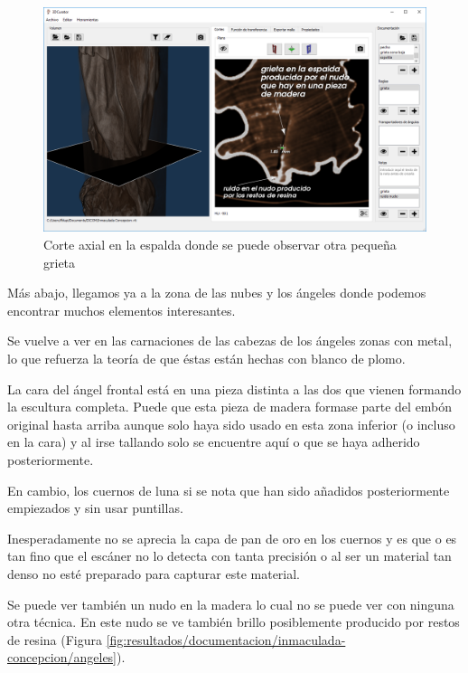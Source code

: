 \begin{figure}[H]
	\centering
	\includegraphics[width=12.5cm]{imagenes/resultados/documentacion/inmaculada-concepcion/espalda}
	\caption{Corte axial en la espalda donde se puede observar otra pequeña grieta}
	\label{fig:resultados/documentacion/inmaculada-concepcion/espalda}
\end{figure}

Más abajo, llegamos ya a la zona de las nubes y los ángeles donde podemos encontrar muchos elementos interesantes.

Se vuelve a ver en las carnaciones de las cabezas de los ángeles zonas con metal, lo que refuerza la teoría de que éstas están hechas con blanco de plomo.

La cara del ángel frontal está en una pieza distinta a las dos que vienen formando la escultura completa. Puede que esta pieza de madera formase parte del embón original hasta arriba aunque solo haya sido usado en esta zona inferior (o incluso en la cara) y al irse tallando solo se encuentre aquí o que se haya adherido posteriormente.

En cambio, los cuernos de luna si se nota que han sido añadidos posteriormente empiezados y sin usar puntillas.

Inesperadamente no se aprecia la capa de pan de oro en los cuernos y es que o es tan fino que el escáner no lo detecta con tanta precisión o al ser un material tan denso no esté preparado para capturar este material.

Se puede ver también un nudo en la madera lo cual no se puede ver con ninguna otra técnica. En este nudo se ve también brillo posiblemente producido por restos de resina (Figura \ref{fig:resultados/documentacion/inmaculada-concepcion/angeles}). 

